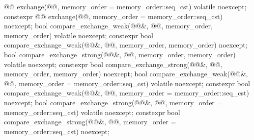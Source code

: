 \begin{codeblock}
{{    @@ exchange(@@,
                           memory_order = memory_order::seq_cst) volatile noexcept;
    constexpr @@ exchange(@@,
                                     memory_order = memory_order::seq_cst) noexcept;
    bool compare_exchange_weak(@@&, @@,
                               memory_order, memory_order) volatile noexcept;
    constexpr bool compare_exchange_weak(@@&, @@,
                                         memory_order, memory_order) noexcept;
    bool compare_exchange_strong(@@&, @@,
                                 memory_order, memory_order) volatile noexcept;
    constexpr bool compare_exchange_strong(@@&, @@,
                                           memory_order, memory_order) noexcept;
    bool compare_exchange_weak(@@&, @@,
                               memory_order = memory_order::seq_cst) volatile noexcept;
    constexpr bool compare_exchange_weak(@@&, @@,
                                         memory_order = memory_order::seq_cst) noexcept;
    bool compare_exchange_strong(@@&, @@,
                                 memory_order = memory_order::seq_cst) volatile noexcept;
    constexpr bool compare_exchange_strong(@@&, @@,
                                           memory_order = memory_order::seq_cst) noexcept;

}}
\end{codeblock}
